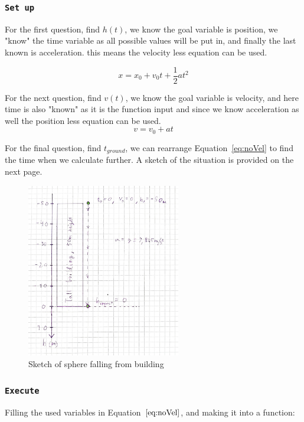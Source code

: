 \documentclass{article}
\let\oldsubsubsection\subsubsection
\renewcommand{\subsubsection}[1]{%
  \oldsubsubsection{\texttt{#1}}%
}
\begin{document}
\subsubsection{Set up}
For the first question, find \(h(t)\), we know the goal variable is position, we "know" the time variable as all possible values will be put in, and finally the last known is acceleration. this means the velocity less equation can be used.

\begin{equation}
    x = x_0 + v_0t + \frac{1}{2}at^2
    \label{eq:noVel}
\end{equation}

For the next question, find \(v(t)\), we know the goal variable is velocity, and here time is also "known" as it is the function input and since we know acceleration as well the position less equation can be used.
\begin{equation}
    v = v_0 + at
    \label{eq:noPos}
\end{equation}

For the final question, find \(t_{ground}\), we can rearrange Equation~\ref{eq:noVel} to find the time when we calculate further. A sketch of the situation is provided on the next page.

\clearpage
\begin{figure}[h]
    \centering
    \includegraphics[width=0.6\textwidth]{Figures/Sketch1.jpg}
    \caption{Sketch of sphere falling from building}
    \label{fig:sketch_1}
\end{figure}

\subsubsection{Execute}
Filling the used variables in Equation~\(\ref{eq:noVel}\), and making it into a function:
\end{document}
